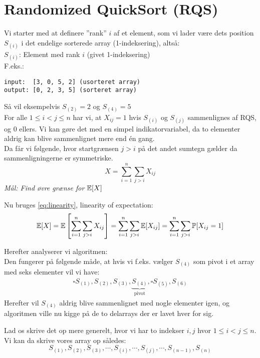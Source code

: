 \section{Randomized QuickSort (RQS)}

Vi starter med at definere ''rank'' $i$ af et element, som vi lader være dets position $S_{(i)}$ i det endelige sorterede array (1-indeksering), altså:\\

$S_{(i)}$: Element med rank $i$ (givet 1-indeksering)\\

F.eks.:
\begin{verbatim}
input:  [3, 0, 5, 2] (usorteret array)
output: [0, 2, 3, 5] (sorteret array)
\end{verbatim}
Så vil eksempelvis $S_{(2)} = 2$ og $S_{(4)} = 5$\\


For alle $1 \leq i < j \leq n$ har vi, at $X_{ij} = 1$ hvis $S_{(i)}$ og $S_{(j)}$ sammenlignes af RQS, og 0 ellers. Vi kan gøre det med en simpel indikatorvariabel, da to elementer aldrig kan blive sammenlignet mere end én gang.\\

Da får vi følgende, hvor startgrænsen $j > i$ på det andet sumtegn gælder da sammenligningerne er symmetriske.
$$
X = \sum_{i=1}^n \sum_{j>i} X_{ij}
$$
\textit{Mål: Find øvre grænse for ${\mathbb E}[X]$}

Nu bruges \cref{eq:linearity}, linearity of expectation:
\begin{align} \label{eq:exp-X}
{\mathbb E}[X] = {\mathbb E} \left[  \sum_{i=1}^n \sum_{j>i} X_{ij} \right] = \sum_{i=1}^n \sum_{j>i} {\mathbb E}[X_{ij}] = \sum_{i=1}^n \sum_{j>i} {\mathbb P}[X_{ij} = 1]
\end{align}

Herefter analyserer vi algoritmen:\\
Den fungerer på følgende måde, at hvis vi f.eks. vælger $S_{(4)}$ som pivot i et array med seks elementer vil vi have:
\begin{align} \label{eq:eksempel}
\square{S_{(1)}, S_{(2)}, S_{(3)},} \underbrace{S_{(4)}}_{\text{pivot}}, \square{ S_{(5)}, S_{(6)}}
\end{align}
Herefter vil $S_{(4)}$ aldrig blive sammenlignet med nogle elementer igen, og algoritmen ville nu kigge på de to delarrays der er lavet hver for sig.


Lad os skrive det op mere generelt, hvor vi har to indekser $i,j$ hvor $1 \leq i < j \leq n$. Vi kan da skrive vores array op således:
$$
S_{(1)}, S_{(2)}, S_{(3)}, \cdots, S_{(i)}, \cdots, S_{(j)}, \cdots, S_{(n-1)}, S_{(n)}
$$

